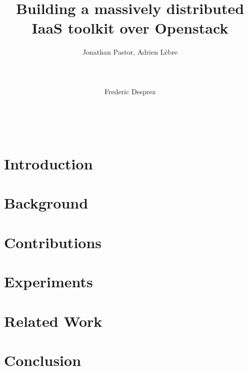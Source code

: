 \documentclass{acm/acm_proc_article-sp}
\begin{document}
\title{Building a massively distributed IaaS toolkit over Openstack}

\author{
%
Jonathan Pastor, Adrien Lèbre\\
       \\
       \\
       \\
\alignauthor
Frederic Desprez\\
       \\
       \\
       \\
}

\maketitle




\section{Introduction}
\label{sec:intro} 


\section{Background}
\label{sec:back}


\section{Contributions}
\label{sec:contribs}


\section{Experiments}
\label{sec:exps}


\section{Related Work}
\label{sec:related}


\section{Conclusion}
\label{sec:con}





\end{document}
